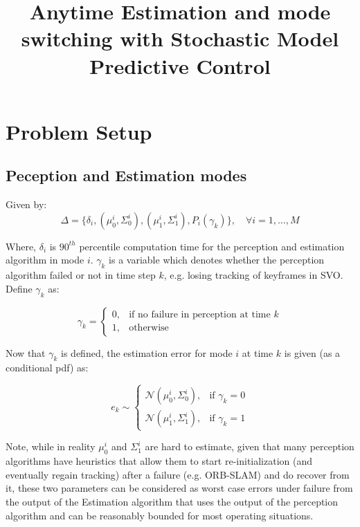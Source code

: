 \documentclass{article}[14pt]
\title{Anytime Estimation and mode switching with Stochastic Model Predictive Control}
\begin{document}
	\maketitle

	\section{Problem Setup}

	\subsection{Peception and Estimation modes}
	Given by:
	\begin{equation}
		\Delta = \{\delta_i, (\mu^i_0, \Sigma^i_0), (\mu^i_1, \Sigma^i_1), P_i(\gamma_k)\}, \quad \forall i = 1,\dotsc, M \nonumber
		\label{eq:modes}
	\end{equation}

	Where, $\delta_i$ is $90^{th}$ percentile computation time for the perception and estimation algorithm in mode $i$. $\gamma_k$ is a variable which denotes whether the perception algorithm failed or not in time step $k$, e.g. losing tracking of keyframes in SVO. Define $\gamma_k$ as:


	\begin{equation}
		\gamma_k  = 
		\begin{cases}
			0,& \text{if no failure in perception at time $k$}\\
			1,              & \text{otherwise}
		\end{cases}
	\end{equation}

	Now that $\gamma_k$ is defined, the estimation error for mode $i$ at time $k$ is given (as a conditional pdf) as:

	\begin{equation}
		e_k  \sim
		\begin{cases}
			\mathcal{N}(\mu^i_0,\Sigma^i_0) ,& \text{if } \gamma_k = 0\\
			\mathcal{N}(\mu^i_1,\Sigma^i_1), & \text{if } \gamma_k = 1
		\end{cases}
		\label{eq:ek_pdf_cond}
	\end{equation}

	Note, while in reality $\mu^i_0$ and $\Sigma^i_1$ are hard to estimate, given that many perception algorithms have heuristics that allow them to start re-initialization (and eventually regain tracking) after a failure (e.g. ORB-SLAM) and do recover from it, these two parameters can be considered as worst case errors under failure from the output of the Estimation algorithm that uses the output of the perception algorithm and can be reasonably bounded for most operating situations.
\end{document}
